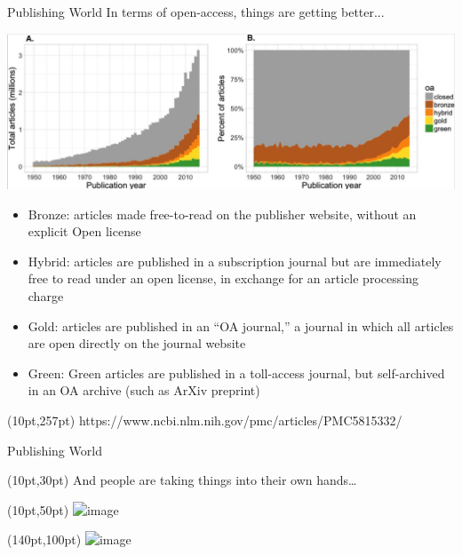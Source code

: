 \documentclass{beamer}
\begin{document}
\begin{frame}{Publishing World}
	In terms of open-access, things are getting better... 

\begin{center}
	\includegraphics[width=.8\textwidth]{../images/openaccesstimeline.png}
\end{center}

	\vspace{-10pt}
	
	\footnotesize{
	\begin{itemize}

		\item<2-> Bronze: articles made free-to-read on the publisher website, without an explicit Open license
		\item<3-> Hybrid: articles are published in a subscription journal but are immediately free to read under an open license, in exchange for an article processing charge
		\item<4-> Gold: articles are published in an ``OA journal,'' a journal in which all articles are open directly on the journal website
		\item<5-> Green: Green articles are published in a toll-access journal, but self-archived in an OA archive (such as ArXiv preprint)
	\end{itemize}}

	\begin{textblock*}{300pt}(10pt,257pt)
		\tiny{https://www.ncbi.nlm.nih.gov/pmc/articles/PMC5815332/}
	
	\end{textblock*}

\end{frame}

\begin{frame}{Publishing World}
	\begin{textblock*}{300pt}(10pt,30pt)
		And people are taking things into their own hands\dots

	\end{textblock*}
	
	\begin{textblock*}{300pt}(10pt,50pt)
		\includegraphics<2->[width=.7\textwidth]{../images/NeuroImage_Resign.png}

	\end{textblock*}

	\begin{textblock*}{300pt}(140pt,100pt)
		\includegraphics<3->[width=.7\textwidth]{../images/scihub.png}

	\end{textblock*}

	
\end{frame}
\end{document}
